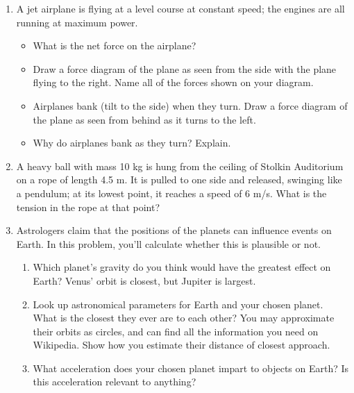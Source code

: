 \documentclass[12pt]{article}
\begin{document}
\Large
\centerline{}
\normalsize
\centerline{}

\begin{enumerate}


  \item A jet airplane is flying at a level course at constant speed; the engines are all running at maximum power. 

\begin{itemize}

\item What is the net force on the airplane?

\item Draw a force diagram of the plane as seen from the side with the plane
flying to the right. Name all of the forces shown on your diagram. 

\item Airplanes bank (tilt to the side) when they turn. Draw a force diagram of the 
plane as seen from behind as it turns to the left. 

\item Why do airplanes bank as they turn? Explain.
\end{itemize}

\item A heavy ball with mass 10 kg is hung from the ceiling of Stolkin Auditorium
on a rope of length 4.5 m. It is pulled to one side and released, swinging like
a pendulum; at its lowest point, it reaches a speed of 6 m/s. What is the tension
in the rope at that point?

  \item Astrologers claim that the positions of the planets can influence events on Earth. In this problem,
you'll calculate whether this is plausible or not.

\begin{enumerate}
\item Which planet's gravity do you think would have the greatest effect on Earth? Venus' orbit is closest,
but Jupiter is largest.
\item Look up astronomical parameters for Earth and your chosen planet. What is the closest they ever
are to each other? You may approximate their orbits as circles, and can find all the information you need
on Wikipedia. Show how you estimate their distance of closest approach.
\item What acceleration does your chosen planet impart to objects on Earth? Is this acceleration relevant 
to anything?
\end{enumerate}


\end{enumerate}
\end{document}
